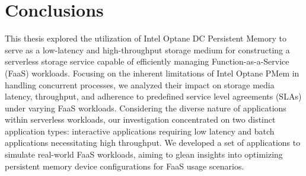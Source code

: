 


\chapter{Conclusions}

This thesis explored the utilization of Intel Optane DC Persistent Memory to serve as a low-latency and high-throughput storage medium for constructing a serverless storage service capable of efficiently managing Function-as-a-Service (FaaS) workloads. Focusing on the inherent limitations of Intel Optane PMem in handling concurrent processes, we analyzed their impact on storage media latency, throughput, and adherence to predefined service level agreements (SLAs) under varying FaaS workloads. Considering the diverse nature of applications within serverless workloads, our investigation concentrated on two distinct application types: interactive applications requiring low latency and batch applications necessitating high throughput. We developed a set of applications to simulate real-world FaaS workloads, aiming to glean insights into optimizing persistent memory device configurations for FaaS usage scenarios.

